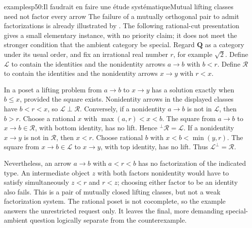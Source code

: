 \begin{dcomment}{examples}{p50:Il faudrait en faire une étude systématique}{Mutual lifting classes need not factor every arrow}
The failure of a mutually orthogonal pair to admit factorizations is already illustrated by \citet[Example~5.7.10]{Taylor1999PracticalFoundations}. The following rational-cut presentation gives a small elementary instance, with no priority claim; it does not meet the stronger condition that the ambient category be special. Regard $\mathbf Q$ as a category under its usual order, and fix an irrational real number $r$, for example $\sqrt2$. Define $\mathcal L$ to contain the identities and the nonidentity arrows $a\to b$ with $b<r$. Define $\mathcal R$ to contain the identities and the nonidentity arrows $x\to y$ with $r<x$.

In a poset a lifting problem from $a\to b$ to $x\to y$ has a solution exactly when $b\leq x$, provided the square exists. Nonidentity arrows in the displayed classes have $b<r<x$, so $\mathcal L\perp\mathcal R$. Conversely, if a nonidentity $a\to b$ is not in $\mathcal L$, then $b>r$. Choose a rational $x$ with $\max(a,r)<x<b$. The square from $a\to b$ to $x\to b\in\mathcal R$, with bottom identity, has no lift. Hence ${}^\perp\mathcal R=\mathcal L$. If a nonidentity $x\to y$ is not in $\mathcal R$, then $x<r$. Choose rational $b$ with $x<b<\min(y,r)$. The square from $x\to b\in\mathcal L$ to $x\to y$, with top identity, has no lift. Thus $\mathcal L^\perp=\mathcal R$.

Nevertheless, an arrow $a\to b$ with $a<r<b$ has no factorization of the indicated type. An intermediate object $z$ with both factors nonidentity would have to satisfy simultaneously $z<r$ and $r<z$; choosing either factor to be an identity also fails. This is a pair of mutually closed lifting classes, but not a weak factorization system. The rational poset is not cocomplete, so the example answers the unrestricted request only. It leaves the final, more demanding special-ambient question logically separate from the counterexample.
\end{dcomment}
